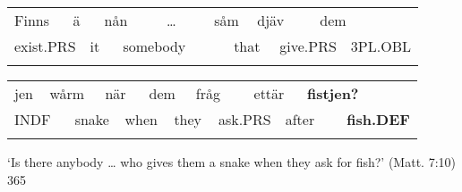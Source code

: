 \begin{tabular}{llllllllllllll}
\lsptoprule
Finns & \multicolumn{2}{l}{ä

} & \multicolumn{2}{l}{nån

} & \multicolumn{2}{l}{…

} & \multicolumn{2}{l}{såm

} & \multicolumn{2}{l}{djäv

} & \multicolumn{2}{l}{dem

} & \\
\multicolumn{2}{l}{exist.PRS

} & \multicolumn{2}{l}{it

} & \multicolumn{2}{l}{somebody

} & \multicolumn{2}{l}{} & \multicolumn{2}{l}{that

} & \multicolumn{2}{l}{give.PRS

} & \multicolumn{2}{l}{3PL.OBL

}\\
\lspbottomrule
\end{tabular}

\begin{tabular}{llllllllllllll}
\lsptoprule
jen & \multicolumn{2}{l}{wårm

} & \multicolumn{2}{l}{när

} & \multicolumn{2}{l}{dem

} & \multicolumn{2}{l}{fråg

} & \multicolumn{2}{l}{ettär

} & \multicolumn{2}{l}{{\bfseries fistjen?}

} & \\
\multicolumn{2}{l}{INDF

} & \multicolumn{2}{l}{snake

} & \multicolumn{2}{l}{when

} & \multicolumn{2}{l}{they

} & \multicolumn{2}{l}{ask.PRS

} & \multicolumn{2}{l}{after

} & \multicolumn{2}{l}{{\bfseries fish.DEF}

}\\
\lspbottomrule
\end{tabular}

\begin{styleTranslation}
‘Is there anybody … who gives them a snake when they ask for fish?’ (Matt. 7:10) 365

\end{styleTranslation}

